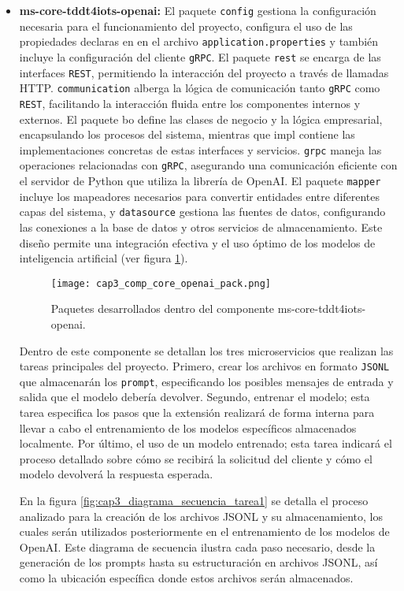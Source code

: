 \begin{itemize}
	\item \textbf{ms-core-tddt4iots-openai: } El paquete \texttt{config} gestiona la configuración necesaria para el funcionamiento del proyecto, configura el uso de las propiedades declaras en en el archivo \texttt{application.properties} y también incluye la configuración del cliente \texttt{gRPC}. El paquete \texttt{rest} se encarga de las interfaces \texttt{REST}, permitiendo la interacción del proyecto a través de llamadas HTTP. \texttt{communication} alberga la lógica de comunicación tanto \texttt{gRPC} como \texttt{REST}, facilitando la interacción fluida entre los componentes internos y externos. El paquete bo define las clases de negocio y la lógica empresarial, encapsulando los procesos del sistema, mientras que impl contiene las implementaciones concretas de estas interfaces y servicios. \texttt{grpc} maneja las operaciones relacionadas con \texttt{gRPC}, asegurando una comunicación eficiente con el servidor de Python que utiliza la librería de OpenAI. El paquete \texttt{mapper} incluye los mapeadores necesarios para convertir entidades entre diferentes capas del sistema, y \texttt{datasource} gestiona las fuentes de datos, configurando las conexiones a la base de datos y otros servicios de almacenamiento. Este diseño permite una integración efectiva y el uso óptimo de los modelos de inteligencia artificial (ver figura \ref{fig:cap3_comp_core_openai_pack}).
	
	\begin{figure}[H]
		\centering
		\texttt{[image: cap3\_comp\_core\_openai\_pack.png]}
		\caption{Paquetes desarrollados dentro del componente ms-core-tddt4iots-openai.}
		\label{fig:cap3_comp_core_openai_pack}
	\end{figure}
	
	Dentro de este componente se detallan los tres microservicios que realizan las tareas principales del proyecto. Primero, crear los archivos en formato \texttt{JSONL} que almacenarán los \texttt{prompt}, especificando los posibles mensajes de entrada y salida que el modelo debería devolver. Segundo, entrenar el modelo; esta tarea especifica los pasos que la extensión realizará de forma interna para llevar a cabo el entrenamiento de los modelos específicos almacenados localmente. Por último, el uso de un modelo entrenado; esta tarea indicará el proceso detallado sobre cómo se recibirá la solicitud del cliente y cómo el modelo devolverá la respuesta esperada.
	
	En la figura \ref{fig:cap3_diagrama_secuencia_tarea1} se detalla el proceso analizado para la creación de los archivos JSONL y su almacenamiento, los cuales serán utilizados posteriormente en el entrenamiento de los modelos de OpenAI. Este diagrama de secuencia ilustra cada paso necesario, desde la generación de los prompts hasta su estructuración en archivos JSONL, así como la ubicación específica donde estos archivos serán almacenados. 
	

\end{itemize}

